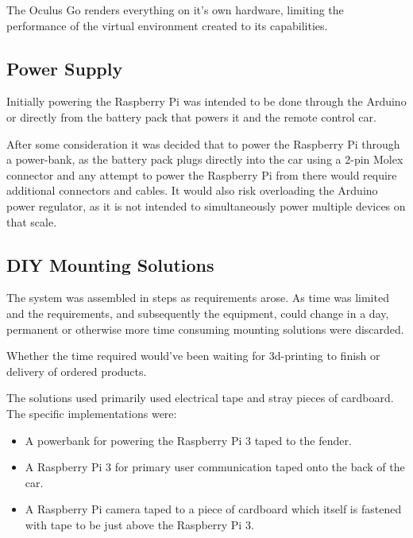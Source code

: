 The Oculus Go renders everything on it's own hardware, limiting the performance
of the virtual environment created to its capabilities.

\subsection{Power Supply}\label{sec:power_supply}

Initially powering the Raspberry Pi was intended to be done through the Arduino
or directly from the battery pack that powers it and the remote control car.

After some consideration it was decided that to power the Raspberry Pi through
a power-bank,  as the battery pack plugs directly into the car using a 2-pin
Molex connector and any attempt to power the Raspberry Pi from there would
require additional connectors and cables. It would also risk overloading
the Arduino power regulator, as it is not intended to simultaneously power
multiple devices on that scale.

\subsection{DIY Mounting Solutions}\label{sec:diy}

The system was assembled in steps as requirements arose. As time was limited
and the requirements, and subsequently the equipment, could change in a day,
permanent or otherwise more time consuming mounting solutions were discarded. 

Whether the time required would've been waiting for 3d-printing to finish or
delivery of ordered products.  

The solutions used primarily used electrical tape and stray pieces of
cardboard. The specific implementations were:
\begin{itemize}
\item A powerbank for powering the Raspberry Pi 3 taped to the fender. 
\item A Raspberry Pi 3 for primary user communication taped onto the back of
the car. 
\item A Raspberry Pi camera taped to a piece of cardboard which itself is
fastened with tape to be just above the Raspberry Pi 3.
\end{itemize}
%
